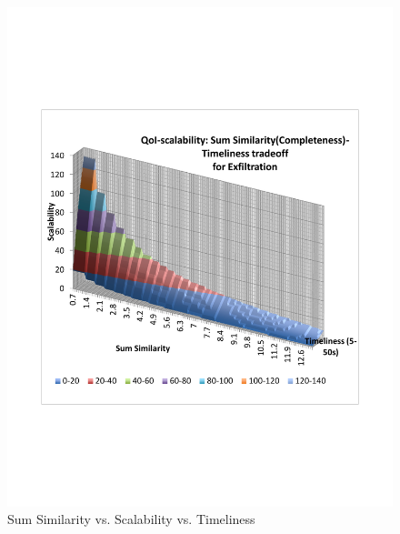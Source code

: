 \begin{figure} 
    \includegraphics[scale=0.35]{figures/topk_fld.pdf}
    \caption{Sum Similarity vs. Scalability vs. Timeliness}
    \label{fig:3dplot1}
\end{figure}